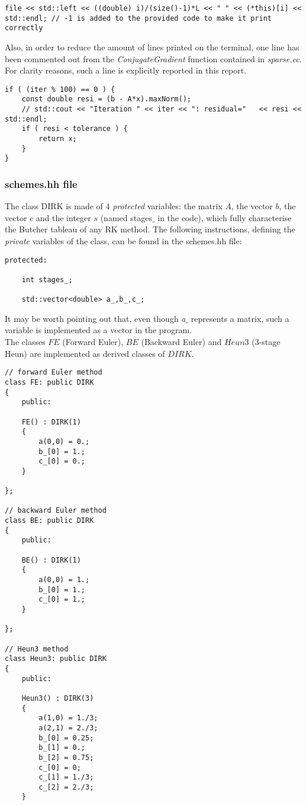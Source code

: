 \documentclass[11pt]{article}
\theoremstyle{theorem}
\theoremstyle{definition}
\begin{document}
\begin{lstlisting}
file << std::left << ((double) i)/(size()-1)*L << " " << (*this)[i] << std::endl; // -1 is added to the provided code to make it print correctly
\end{lstlisting}


Also, in order to reduce the amount of lines printed on the terminal, one line has been commented out from the \emph{ConjugateGradient} function contained in \emph{sparse.cc}. For clarity reasons, such a line is explicitly reported in this report.\\

\begin{lstlisting}
if ( (iter % 100) == 0 ) {
	const double resi = (b - A*x).maxNorm();
	// std::cout << "Iteration " << iter << ": residual=" 	<< resi << std::endl;
	if ( resi < tolerance ) {
		return x;
	}
}
\end{lstlisting}

\subsubsection{schemes.hh file}
\label{subsubsec:schemes}
The class DIRK is made of 4 \emph{protected} variables: the matrix $A$, the vector $b$, the vector $c$ and the integer $s$ (named stages$\_$ in the code), which fully characterise the Butcher tableau of any RK method. The following instructions, defining the \emph{private} variables of the class, can be found in the schemes.hh file:

\begin{lstlisting}
protected:

	int stages_;

	std::vector<double> a_,b_,c_;
\end{lstlisting}

It may be worth pointing out that, even though \emph{a$\_$} represents a matrix, such a variable is implemented as a vector in the program.\\
The classes $FE$ (Forward Euler), $BE$ (Backward Euler) and $Heun3$ (3-stage Heun) are implemented as derived classes of $DIRK$.\\

\begin{lstlisting}
// forward Euler method
class FE: public DIRK
{
	public:
	
	FE() : DIRK(1)
	{
		a(0,0) = 0.;
		b_[0] = 1.;
		c_[0] = 0.;
	}
	
};

// backward Euler method
class BE: public DIRK
{
	public:
	
	BE() : DIRK(1)
	{
		a(0,0) = 1.;
		b_[0] = 1.;
		c_[0] = 1.;
	}
	
};

// Heun3 method
class Heun3: public DIRK
{
	public:
	
	Heun3() : DIRK(3)
	{
		a(1,0) = 1./3;
		a(2,1) = 2./3;
		b_[0] = 0.25;
		b_[1] = 0.;
		b_[2] = 0.75;
		c_[0] = 0;
		c_[1] = 1./3;
		c_[2] = 2./3;
	}
\end{lstlisting}
\end{document}
